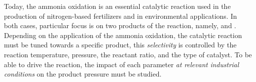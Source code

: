 Today, the ammonia oxidation is an essential catalytic reaction used in the production of nitrogen-based fertilizers and in environmental applications.
In both cases, particular focus is on two products of the reaction, namely, \nitricoxide and \nitrogen.
Depending on the application of the ammonia oxidation, the catalytic reaction must be tuned towards a specific product, this \textit{selectivity} is controlled by the reaction temperature, pressure, the  reactant ratio, and the type of catalyst.
To be able to drive the reaction, the impact of each parameter \textit{at relevant industrial conditions} on the product pressure must be studied.

\begin{landscape}
\begin{table}[!htb]
\centering
{}
\end{table}
\end{landscape}

